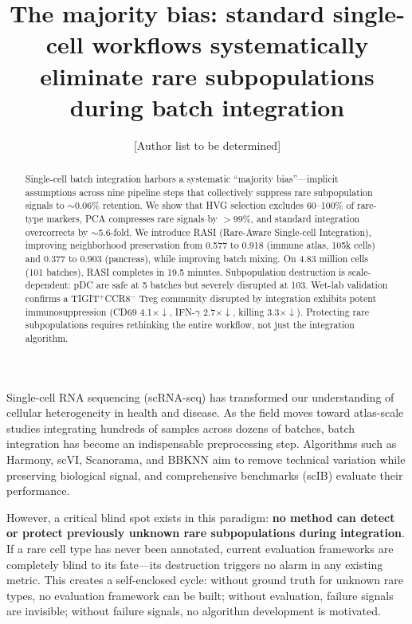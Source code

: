 \documentclass[10pt]{article}
\title{\textbf{The majority bias: standard single-cell workflows systematically eliminate rare subpopulations during batch integration}}
\author{[Author list to be determined]}
\date{}
\begin{document}
\maketitle

\begin{abstract}
Single-cell batch integration harbors a systematic ``majority bias''---implicit assumptions across nine pipeline steps that collectively suppress rare subpopulation signals to $\sim$0.06\% retention. We show that HVG selection excludes 60--100\% of rare-type markers, PCA compresses rare signals by $>$99\%, and standard integration overcorrects by $\sim$5.6-fold. We introduce RASI (Rare-Aware Single-cell Integration), improving neighborhood preservation from 0.577 to 0.918 (immune atlas, 105k cells) and 0.377 to 0.903 (pancreas), while improving batch mixing. On 4.83 million cells (101 batches), RASI completes in 19.5 minutes. Subpopulation destruction is scale-dependent: pDC are safe at 5 batches but severely disrupted at 103. Wet-lab validation confirms a TIGIT$^+$CCR8$^-$ Treg community disrupted by integration exhibits potent immunosuppression (CD69 4.1$\times\!\downarrow$, IFN-$\gamma$ 2.7$\times\!\downarrow$, killing 3.3$\times\!\downarrow$). Protecting rare subpopulations requires rethinking the entire workflow, not just the integration algorithm.
\end{abstract}


Single-cell RNA sequencing (scRNA-seq) has transformed our understanding of cellular heterogeneity in health and disease\cite{regev2017,zheng2017}. As the field moves toward atlas-scale studies integrating hundreds of samples across dozens of batches\cite{kang2024,tabula2022}, batch integration has become an indispensable preprocessing step. Algorithms such as Harmony\cite{korsunsky2019}, scVI\cite{lopez2018}, Scanorama\cite{hie2019}, and BBKNN\cite{polanski2020} aim to remove technical variation while preserving biological signal, and comprehensive benchmarks (scIB\cite{luecken2022}) evaluate their performance.

However, a critical blind spot exists in this paradigm: \textbf{no method can detect or protect previously unknown rare subpopulations during integration}. If a rare cell type has never been annotated, current evaluation frameworks are completely blind to its fate---its destruction triggers no alarm in any existing metric. This creates a self-enclosed cycle: without ground truth for unknown rare types, no evaluation framework can be built; without evaluation, failure signals are invisible; without failure signals, no algorithm development is motivated.
\end{document}
